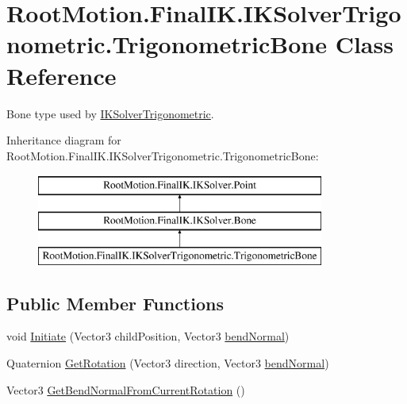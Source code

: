 \hypertarget{class_root_motion_1_1_final_i_k_1_1_i_k_solver_trigonometric_1_1_trigonometric_bone}{}\section{Root\+Motion.\+Final\+I\+K.\+I\+K\+Solver\+Trigonometric.\+Trigonometric\+Bone Class Reference}
\label{class_root_motion_1_1_final_i_k_1_1_i_k_solver_trigonometric_1_1_trigonometric_bone}


Bone type used by \mbox{\hyperlink{class_root_motion_1_1_final_i_k_1_1_i_k_solver_trigonometric}{I\+K\+Solver\+Trigonometric}}.  


Inheritance diagram for Root\+Motion.\+Final\+I\+K.\+I\+K\+Solver\+Trigonometric.\+Trigonometric\+Bone\+:\begin{figure}[H]
\begin{center}
\leavevmode
\includegraphics[height=3.000000cm]{class_root_motion_1_1_final_i_k_1_1_i_k_solver_trigonometric_1_1_trigonometric_bone}
\end{center}
\end{figure}
\subsection*{Public Member Functions}
\begin{DoxyCompactItemize}
\item 
void \mbox{\hyperlink{class_root_motion_1_1_final_i_k_1_1_i_k_solver_trigonometric_1_1_trigonometric_bone_acecd41e5aac8935b66a35d0e5ee1de89}{Initiate}} (Vector3 child\+Position, Vector3 \mbox{\hyperlink{class_root_motion_1_1_final_i_k_1_1_i_k_solver_trigonometric_ae48bca2ec4e7a16ffaf196ea956be5e9}{bend\+Normal}})
\item 
Quaternion \mbox{\hyperlink{class_root_motion_1_1_final_i_k_1_1_i_k_solver_trigonometric_1_1_trigonometric_bone_a5657e99d172da4a3c66f9a4fea246157}{Get\+Rotation}} (Vector3 direction, Vector3 \mbox{\hyperlink{class_root_motion_1_1_final_i_k_1_1_i_k_solver_trigonometric_ae48bca2ec4e7a16ffaf196ea956be5e9}{bend\+Normal}})
\item 
Vector3 \mbox{\hyperlink{class_root_motion_1_1_final_i_k_1_1_i_k_solver_trigonometric_1_1_trigonometric_bone_a9434304413b4983deb2490dbbdccb1a0}{Get\+Bend\+Normal\+From\+Current\+Rotation}} ()
\end{DoxyCompactItemize}
